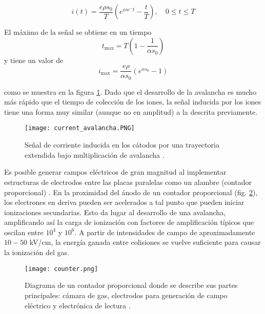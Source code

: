 \documentclass{report}
\begin{document}
\begin{equation}
i(t) = \frac{e \rho s_0}{T} \left( e^{\alpha w^- t} - \frac{t}{T} \right), \quad 0 \leq t \leq T
\end{equation}

El máximo de la señal se obtiene en un tiempo 
\begin{equation}
t_{\text{max}} = T \left( 1 - \frac{1}{\alpha s_0} \right)
\end{equation}
y tiene un valor de 
\begin{equation}
i_{\text{max}} = \frac{e \rho}{\alpha s_0} \left( e^{\alpha s_0} - 1 \right)
\end{equation}

\noindent como se muestra en la figura \ref{fig:current_avalancha}. Dado que el desarrollo de la avalancha es mucho más rápido que el tiempo de colección de los iones, la señal inducida por los iones tiene una forma muy similar (aunque no en amplitud) a la descrita previamente.

\begin{figure}[H]
    \centering
    \texttt{[image: current\_avalancha.PNG]}
    \caption{Señal de corriente inducida en los cátodos por una trayectoria extendida bajo multiplicación de avalancha \cite{sauli2015gaseous5}.}
    \label{fig:current_avalancha}
\end{figure}

\noindent Es posible generar campos eléctricos de gran magnitud al implementar estructuras de electrodos entre las placas paralelas como un alambre (contador proporcional) \cite{montgomery1941geiger}. En la proximidad del ánodo de un contador proporcional (fig. \ref{fig:counter}), los electrones en deriva pueden ser acelerados a tal punto que pueden iniciar ionizaciones secundarias. Esto da lugar al desarrollo de una avalancha, amplificando así la carga de ionización con factores de amplificación típicos que oscilan entre \(10^4\) y \(10^6\). A partir de intensidades de campo de aproximadamente \(10-50\) kV/cm, la energía ganada entre colisiones se vuelve suficiente para causar la ionización del gas.

\begin{figure}[H]
    \centering
    \texttt{[image: counter.png]}
    \caption{Diagrama de un contador proporcional donde se describe sus partes principales: cámara de gas, electrodos para generación de campo eléctrico y electrónica de lectura \cite{winkler2015}.}
    \label{fig:counter}
\end{figure}
\end{document}
